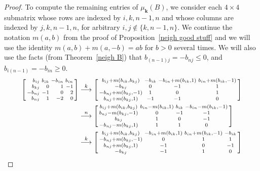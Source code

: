 \documentclass{amsart}
\theoremstyle{definition}
\theoremstyle{remark}
\numberwithin{equation}{section}
\newcommand{\sgn}{\operatorname{sgn}}
\newcommand{\set}[1]{{\lbrace #1 \rbrace}}
\newcommand{\0}{{\mathbf{0}}}
\newcommand{\kk}{{\boldsymbol{k}}}
\begin{document}
\begin{proof}
To compute the remaining entries of $\mu_\kk(B)$, we consider each $4\times4$ submatrix whose rows are indexed by $i,k,n-1,n$ and whose columns are indexed by $j,k,n-1,n$, for arbitrary $i,j\not\in\set{k,n-1,n}$.
We continue the notation $m(a,b)$ from the proof of Proposition~\ref{neigh good stuff} and we will use the identity $m(a,b)+m(a,-b)=ab$ for $b>0$ several times.
We will also use the facts (from Theorem~\ref{neigh B}) that $b_{(n-1)j}=-b_{nj}\le0$, and $b_{i(n-1)}=-b_{in}\ge0$.
\begin{align*}
\begin{bsmallmatrix*}[r]
b_{ij}&b_{ik}&-b_{in}&b_{in}\\
b_{kj}&0&1&-1\\
-b_{nj}&-1&0&2\\
b_{nj}&1&-2&0
\end{bsmallmatrix*}
&\overset{k}{\longrightarrow}
\begin{bsmallmatrix*}
b_{ij}+m(b_{ik},b_{kj}) & -b_{ik} & -b_{in}+m(b_{ik},1) & b_{in}+m(b_{ik},-1)\\
-b_{kj} & 0 & -1 & 1\\
-b_{nj}+m(b_{kj},-1) & 1 & 0 & 1\\
b_{nj}+m(b_{kj},1) & -1 & -1 & 0
\end{bsmallmatrix*}\\
&\overset{n}{\longrightarrow}
\begin{bsmallmatrix*}
b_{ij}+m(b_{ik},b_{kj}) & b_{in}-m(b_{ik},1) & b_{ik} & -b_{in}-m(b_{ik},-1)\\
b_{nj}-m(b_{kj},-1) & 0 & -1 & -1\\
b_{kj} & 1 & 0 & -1\\
-b_{nj}-m(b_{kj},1) & 1 & 1 & 0
\end{bsmallmatrix*}\\
&\overset{k}{\longrightarrow}
\begin{bsmallmatrix*}
b_{ij}+m(b_{ik},b_{kj}) & -b_{in}+m(b_{ik},1) & b_{in}+m(b_{ik},-1) & -b_{ik}\\
-b_{nj}+m(b_{kj},-1) & 0 & 1 & 1\\
b_{nj}+m(b_{kj},1)  & -1 & 0 & -1\\
-b_{kj}& -1 & 1 & 0
\end{bsmallmatrix*}\\

\end{align*}
\end{proof}
\end{document}
